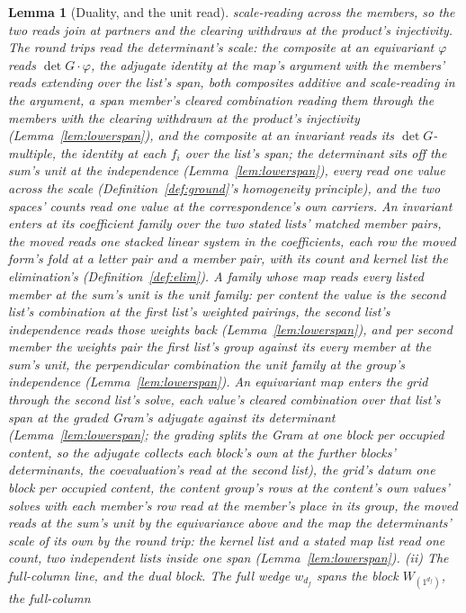 \documentclass[11pt]{article}
\newtheorem{lemma}{Lemma}
\theoremstyle{definition}
\begin{document}
\begin{lemma}[Duality, and the unit read]
scale-reading across the members, so the two reads join at
partners and the clearing withdraws at the product's injectivity.
The round trips read the determinant's scale: the
composite at an equivariant $\varphi$ reads $\det G\cdot\varphi$,
the adjugate identity at the map's argument with the members' reads
extending over the list's span, both composites additive and
scale-reading in the argument, a span member's cleared combination
reading them through the members with the clearing withdrawn at the
product's injectivity (Lemma~\ref{lem:lowerspan}), and the
composite at an invariant reads its $\det G$-multiple, the identity at each $f_i$
over the list's span; the determinant sits off the sum's unit at the
independence (Lemma~\ref{lem:lowerspan}), every read one value
across the scale (Definition~\ref{def:ground}'s homogeneity
principle), and the two spaces' counts read one value at the
correspondence's own carriers.  An invariant enters at its
coefficient family over the two stated lists' matched member
pairs, the moved reads one stacked linear system in the
coefficients, each row the moved form's fold at a letter pair and
a member pair, with its count and kernel list the elimination's
(Definition~\ref{def:elim}).  A family whose map reads every
listed member at the sum's unit is the unit family: per content
the value is the second list's combination at the first list's
weighted pairings, the second list's independence reads those
weights back (Lemma~\ref{lem:lowerspan}), and per second member
the weights pair the first list's group against its every member
at the sum's unit, the perpendicular combination the unit family
at the group's independence (Lemma~\ref{lem:lowerspan}).  An
equivariant map enters the grid through the second list's solve,
each value's cleared combination over that list's span at the
graded Gram's adjugate against its determinant
(Lemma~\ref{lem:lowerspan}; the grading splits the Gram at one
block per occupied content, so the adjugate collects each block's
own at the further blocks' determinants, the coevaluation's read
at the second list), the grid's datum one block per occupied
content, the content group's rows at the content's own values'
solves with each member's row read at the member's place in its
group, the moved reads at
the sum's unit by the equivariance above and the map the
determinants' scale of its own by the round trip: the kernel list
and a stated map list read one count, two independent lists inside
one span (Lemma~\ref{lem:lowerspan}).
\emph{(ii) The full-column line, and the dual block.} The full wedge
$w_{d_f}$ spans the block $W_{(1^{d_f})}$, the \emph{full-column
}
\end{lemma}
\end{document}
